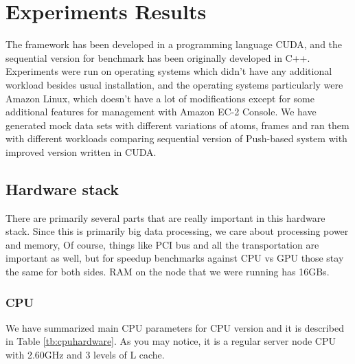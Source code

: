 \documentclass[12pt,letterpaper]{report}
\begin{document}
\chapter{Experiments Results}\label{sc:experiments}
\hspace{3em} The framework has been developed in a programming language CUDA, and the sequential version for benchmark\cite{mainPaper} has been originally developed in C++. Experiments were run on operating systems which didn't have any additional workload besides usual installation, and the operating systems particularly were Amazon Linux, which doesn't have a lot of modifications except for some additional features for management with Amazon EC-2 Console. We have generated mock data sets with different variations of atoms, frames and ran them with different workloads comparing sequential version of Push-based system with improved version written in CUDA.

\section{Hardware stack}
\hspace{3em} There are primarily several parts that are really important in this hardware stack. Since this is primarily big data processing, we care about processing power and memory, Of course, things like PCI bus and all the transportation are important as well, but for speedup benchmarks against CPU vs GPU those stay the same for both sides. RAM on the node that we were running has 16GBs. 

\subsection{CPU}
\hspace{3em} We have summarized main CPU parameters for CPU version and it is described in Table \ref{tb:cpuhardware}. As you may notice, it is a regular server node CPU with 2.60GHz and 3 levels of L cache.
\end{document}
